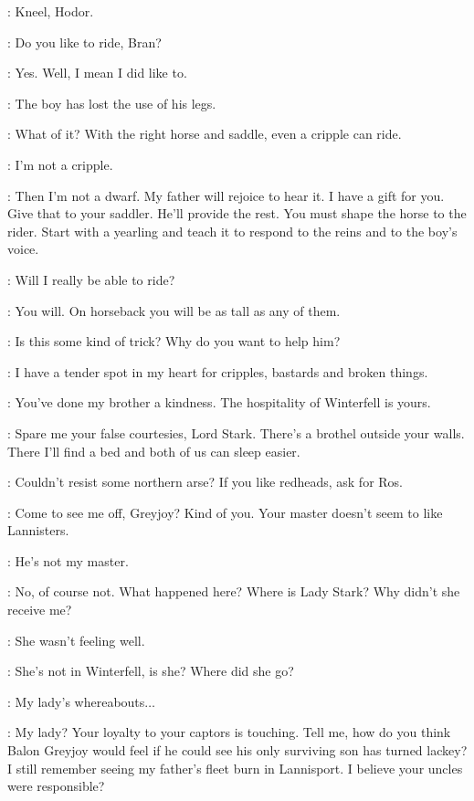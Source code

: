 \BRAN: Kneel, Hodor. 

\TYRION: Do you like to ride, Bran? 

\BRAN: Yes. Well, I mean I did like to. 

\LUWIN: The boy has lost the use of his legs. 

\TYRION: What of it? With the right horse and saddle, even a cripple can ride. 

\BRAN: I'm not a cripple. 

\TYRION: Then I'm not a dwarf. My father will rejoice to hear it. I have a gift for you.  Give that to your saddler. He'll provide the rest. You must shape the horse to the rider. Start with a yearling and teach it to respond to the reins and to the boy's voice. 

\BRAN: Will I really be able to ride? 

\TYRION: You will. On horseback you will be as tall as any of them. 

\ROBB: Is this some kind of trick? Why do you want to help him? 

\TYRION: I have a tender spot in my heart for cripples, bastards and broken things. 

\ROBB: You've done my brother a kindness. The hospitality of Winterfell is yours. 

\TYRION: Spare me your false courtesies, Lord Stark. There's a brothel outside your walls. There I'll find a bed and both of us can sleep easier. 

\scene



\THEON: Couldn't resist some northern arse? If you like redheads, ask for Ros. 

\TYRION: Come to see me off, Greyjoy? Kind of you. Your master doesn't seem to like Lannisters. 

\THEON: He's not my master. 

\TYRION: No, of course not. What happened here? Where is Lady Stark? Why didn't she receive me? 

\THEON: She wasn't feeling well. 

\TYRION: She's not in Winterfell, is she? Where did she go? 

\THEON: My lady's whereabouts$\ldots$ 

\TYRION: My lady? Your loyalty to your captors is touching. Tell me, how do you think Balon Greyjoy would feel if he could see his only surviving son has turned lackey? I still remember seeing my father's fleet burn in Lannisport. I believe your uncles were responsible? 

